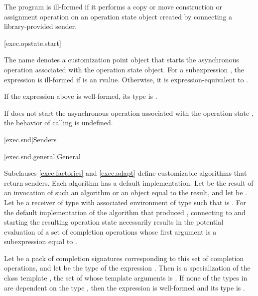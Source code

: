 \pnum
The program is ill-formed
if it performs a copy or move construction or assignment operation on
an operation state object created by connecting a library-provided sender.

[exec.opstate.start]{}

\pnum
The name  denotes a customization point object
that starts
the asynchronous operation associated with the operation state object.
For a subexpression ,
the expression  is ill-formed
if  is an rvalue.
Otherwise, it is expression-equivalent to
.

\mandates
If the expression above is well-formed, its type is .

\pnum
If  does not start
the asynchronous operation associated with the operation state ,
the behavior of calling  is undefined.

[exec.snd]{Senders}

[exec.snd.general]{General}

\pnum
Subclauses \ref{exec.factories} and \ref{exec.adapt} define
customizable algorithms that return senders.
Each algorithm has a default implementation.
Let  be the result of an invocation of such an algorithm or
an object equal to the result, and
let  be .
Let  be a receiver of type 
with associated environment  of type 
such that  is .
For the default implementation of the algorithm that produced ,
connecting  to  and
starting the resulting operation state
necessarily results in the potential evaluation of
a set of completion operations
whose first argument is a subexpression equal to .

\pnum
Let  be a pack of completion signatures corresponding to
this set of completion operations, and
let  be
the type of the expression .
Then  is
a specialization of
the class template ,
the set of whose template arguments is .
If none of the types in  are dependent on the type , then
the expression  is well-formed and
its type is .


